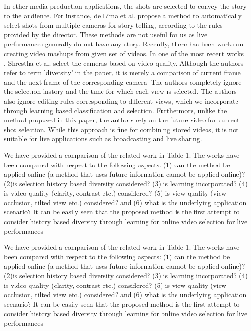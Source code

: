 \documentclass{sig-alternate}
\begin{document}
 In other media production applications, the shots are selected to convey the story to the audience. For instance, de Lima et al. \cite{paddle2006effect} propose a method to automatically select shots from multiple cameras for story telling, according to the rules provided by the director. These methods are not useful for us as live performances generally do not have any story. 
 Recently, there has been works on creating video mashups from given set of videos. In one of the most recent works \cite{economou1983green}, Shrestha et al. select the cameras based on video quality. Although the authors refer to term 'diversity' in the paper, it is merely a comparison of current frame and the next frame of the corresponding camera. The authors completely ignore the selection history and the time for which each view is selected. The authors also ignore editing rules corresponding to different views, which we incorporate through learning based classiﬁcation and selection. Furthermore, unlike the method proposed in this paper, the authors rely on the future video for current shot selection. While this approach is ﬁne for combining stored videos, it is not suitable for live applications such as broadcasting and live sharing. 
 
 We have provided a comparison of the related work in Table 1. The works have been compared with respect to the following aspects: (1) can the method be applied online (a method that uses future information cannot be applied online)? (2)is selection history based diversity considered? (3) is learning incorporated? (4) is video quality (clarity, contrast etc.) considered? (5) is view quality (view occlusion, tilted view etc.) considered? and (6) what is the underlying application scenario? It can be easily seen that the proposed method is the ﬁrst attempt to consider history based diversity through learning for online video selection for live performances.
 
 We have provided a comparison of the related work in Table 1. The works have been compared with respect to the following aspects: (1) can the method be applied online (a method that uses future information cannot be applied online)? (2)is selection history based diversity considered? (3) is learning incorporated? (4) is video quality (clarity, contrast etc.) considered? (5) is view quality (view occlusion, tilted view etc.) considered? and (6) what is the underlying application scenario? It can be easily seen that the proposed method is the ﬁrst attempt to consider history based diversity through learning for online video selection for live performances.
\end{document}
